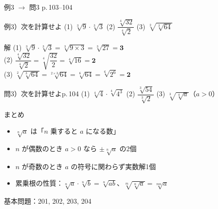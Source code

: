 \documentclass[aspectratio=43,professionalfonts,handout]{beamer}
\begin{document}
\begin{frame}{例3 $\to$ 問3 \hfill{\small p.\,103--104}}
  \begin{exampleblock}{例3）次を計算せよ}
    (1) $\sqrt[3]{9}\cdot\sqrt[3]{3}$\quad
    (2) $\dfrac{\sqrt[4]{32}}{\sqrt[4]{2}}$\quad
    (3) $\sqrt[2]{\sqrt[3]{64}}$
  \end{exampleblock}

  \begin{block}{解}
    (1)\; $\sqrt[3]{9}\cdot\sqrt[3]{3}=\sqrt[3]{9\times 3}=\sqrt[3]{27}=\boldsymbol{3}$\\[3pt]
    (2)\; $\dfrac{\sqrt[4]{32}}{\sqrt[4]{2}}=\sqrt[4]{\dfrac{32}{2}}=\sqrt[4]{16}=\boldsymbol{2}$\\[3pt]
    (3)\; $\sqrt[2]{\sqrt[3]{64}}=\sqrt[2\times3]{64}=\sqrt[6]{64}=\sqrt[6]{2^6}=\boldsymbol{2}$
  \end{block}

  \vfill

  \begin{alertblock}{問3）次を計算せよ\hfill p.\,104}
    (1) $\sqrt[4]{4}\cdot\sqrt[4]{4^3}$\quad
    (2) $\dfrac{\sqrt[3]{54}}{\sqrt[3]{2}}$\quad
    (3) $\sqrt[3]{\sqrt[4]{a}}$（$a>0$）
  \end{alertblock}
\end{frame}

\begin{frame}{まとめ}
  \begin{itemize}
    \item $\sqrt[n]{a}$ は「$n$ 乗すると $a$ になる数」
    \item $n$ が偶数のとき $a>0$ なら $\pm\sqrt[n]{a}$ の2個
    \item $n$ が奇数のとき $a$ の符号に関わらず実数解1個
    \item 累乗根の性質：$\sqrt[n]{a}\cdot\sqrt[n]{b}=\sqrt[n]{ab}$、$\sqrt[m]{\sqrt[n]{a}}=\sqrt[mn]{a}$
  \end{itemize}

  \vfill
  {\small 基本問題：201, 202, 203, 204}
\end{frame}
\end{document}
